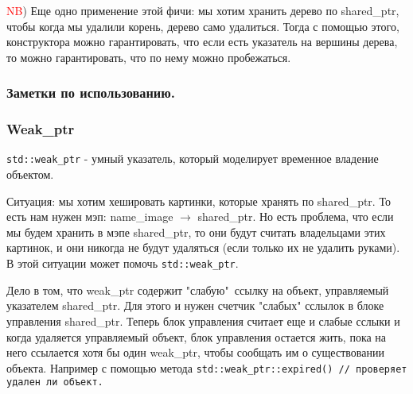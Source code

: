 \documentclass[12pt]{article}
\begin{document}
\textcolor{red}{NB}) Еще одно применение этой фичи: мы хотим хранить дерево по shared\_ptr, чтобы когда мы удалили корень, дерево само удалиться. Тогда с помощью этого, конструктора можно гарантировать, что если есть указатель на вершины дерева, то можно гарантировать, что по нему можно пробежаться.

\subsubsection{Заметки по использованию.}
\subsubsection{Weak\_ptr}
\texttt{std::weak_ptr} - умный указатель, который моделирует временное владение объектом.


Ситуация: мы хотим хешировать картинки, которые хранять по shared\_ptr. То есть нам нужен мэп: name\_image $\to$ shared\_ptr. Но есть проблема, что если мы будем хранить в мэпе shared\_ptr, то они будут считать владельцами этих картинок, и они никогда не будут удаляться (если только их не удалить руками). В этой ситуации может помочь \texttt{std::weak_ptr}.


Дело в том, что weak\_ptr содержит "слабую"\ ссылку на объект, управляемый указателем shared\_ptr. Для этого и нужен счетчик "слабых" сслылок в блоке управления shared\_ptr. Теперь блок управления считает еще и слабые сслыки и когда удаляется управляемый объект, блок управления остается жить, пока на него ссылается хотя бы один weak\_ptr, чтобы сообщать им о существовании объекта. Например с помощью метода \texttt{std::weak_ptr::expired() // проверяет удален ли объект.}
\end{document}

